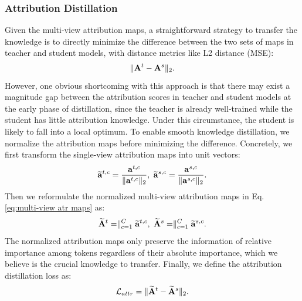 \documentclass[11pt]{article}
\begin{document}
\subsubsection{Attribution Distillation}
Given the multi-view attribution maps, a straightforward strategy to transfer the knowledge is to directly minimize the difference between the two sets of maps in teacher and student models, with distance metrics like L2 distance (MSE):
\begin{equation}
\small
    \Vert \mathbf{A}^{t} - \mathbf{A}^{s} \Vert_2.
\end{equation}
However, one obvious shortcoming with this approach is that there may exist a magnitude gap between the attribution scores in teacher and student models at the early phase of distillation, since the teacher is already well-trained while the student has little attribution knowledge. Under this circumstance, the student is likely to fall into a local optimum. To enable smooth knowledge distillation, we normalize the attribution maps before minimizing the difference. Concretely, we first transform the single-view attribution maps into unit vectors:
\begin{equation}
\small
    \widetilde{\mathbf{a}}^{t,c} = \frac{\mathbf{a}^{t,c}}{\Vert \mathbf{a}^{t,c} \Vert_2}, \
    \widetilde{\mathbf{a}}^{s,c} = \frac{\mathbf{a}^{s,c}}{\Vert \mathbf{a}^{s,c} \Vert_2}.
\end{equation}
Then we reformulate the normalized multi-view attribution maps in Eq. \eqref{eq:multi-view atr maps} as:
\begin{equation}
\small
    \widetilde{\mathbf{A}}^{t} = \parallel_{c=1}^{C} \widetilde{\mathbf{a}}^{t,c},\
    \widetilde{\mathbf{A}}^{s} = \parallel_{c=1}^{C} \widetilde{\mathbf{a}}^{s,c}.
\end{equation}
The normalized attribution maps only preserve the information of relative importance among tokens regardless of their absolute importance, which we believe is the crucial knowledge to transfer. Finally, we define the attribution distillation loss as:
\begin{equation}\label{eq:attribution loss}
\small
     \mathcal{L}_{attr} = \Vert \widetilde{\mathbf{A}}^{t} - \widetilde{\mathbf{A}}^{s} \Vert_2.
\end{equation}
\end{document}
